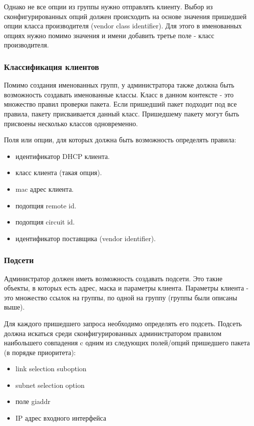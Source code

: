 \documentclass[14pt]{extarticle}
\begin{document}
Однако не все опции из группы нужно отправлять клиенту. Выбор из сконфигурированных опций должен происходить на основе значения пришедшей опции класса производителя (vendor class identifier). Для этого в именованных опциях нужно помимо значения и имени добавить третье поле - класс производителя.



\subsubsection{Классификация клиентов}

Помимо создания именованных групп, у администратора также должна быть возможность создавать именованные классы.
Класс в данном контексте - это множество правил проверки пакета.
Если пришедший пакет подходит под все правила, пакету присваивается данный класс.
Пришедшему пакету могут быть присвоены несколько классов одновременно.

Поля или опции, для которых должна быть возможность определять правила:

\begin{itemize}
    \item идентификатор DHCP клиента.
    \item класс клиента (такая опция).
    \item mac адрес клиента.
    \item подопция remote id.
    \item подопция circuit id.
    \item идентификатор поставщика (vendor identifier).
\end{itemize}


\subsubsection{Подсети}

Администратор должен иметь возможность создавать подсети.
Это такие объекты, в которых есть адрес, маска и параметры клиента.
Параметры клиента - это множество ссылок на группы, по одной на группу (группы были описаны выше).

Для каждого пришедшего запроса необходимо определять его подсеть.
Подсеть должна искаться среди сконфигурированных администратором правилом наибольшего совпадения c одним из следующих полей/опций пришедшего пакета (в порядке приоритета):

\begin{itemize}
    \item link selection suboption
    \item subnet selection option
    \item поле giaddr
    \item IP адрес входного интерфейса
\end{itemize}
\end{document}

